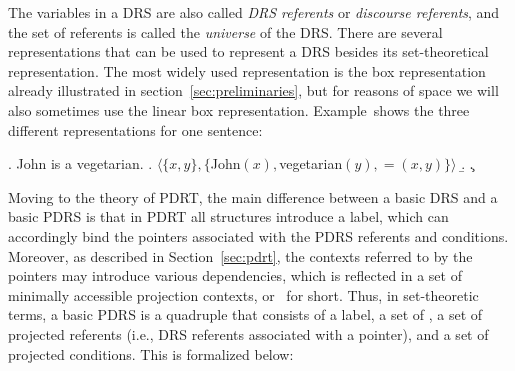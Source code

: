 \noindent The variables in a DRS are also called \textit{DRS referents} or
\textit{discourse referents}, and the set of referents is called the
\textit{universe} of the DRS.  There are several representations that can be
used to represent a DRS besides its set-theoretical representation. The most
widely used representation is the box representation already illustrated in
section~\ref{sec:preliminaries}, but for reasons of space we will also
sometimes use the linear box representation. Example~\Next shows the three
different representations for one sentence:

\ex. John is a vegetarian.
\a. $\langle \{x, y\},\{$John$(x),$vegetarian$(y), =(x,y)\}\rangle$
\b. 
\c. 

Moving to the theory of PDRT, the main difference between a basic DRS and
a basic PDRS is that in PDRT all structures introduce a label, which can
accordingly bind the pointers associated with the PDRS referents and
conditions.  Moreover, as described in Section~\ref{sec:pdrt}, the contexts
referred to by the pointers may introduce various dependencies, which is
reflected in a set of minimally accessible projection contexts, or \MAPs~for
short.  Thus, in set-theoretic terms, a basic PDRS is a quadruple that
consists of a label, a set of \MAPs, a set of projected referents (i.e., DRS
referents associated with a pointer), and a set of projected conditions.
This is formalized below:

